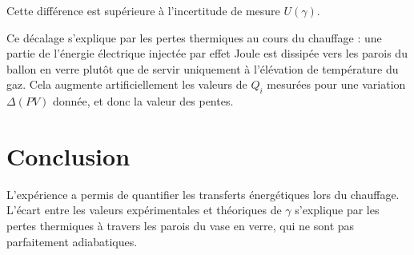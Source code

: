 \documentclass[a4paper,9pt,french]{scrartcl}
\begin{document}
Cette différence est supérieure à l'incertitude de mesure $U(\gamma)$.

Ce décalage s'explique par les pertes thermiques au cours du chauffage : une partie de l'énergie électrique injectée par effet Joule est dissipée vers les parois du ballon en verre plutôt que de servir uniquement à l'élévation de température du gaz. Cela augmente artificiellement les valeurs de $Q_i$ mesurées pour une variation $\Delta(PV)$ donnée, et donc la valeur des pentes.
\section{Conclusion}
L'expérience a permis de quantifier les transferts énergétiques lors du chauffage. L'écart entre les valeurs expérimentales et théoriques de $\gamma$ s'explique par les pertes thermiques à travers les parois du vase en verre, qui ne sont pas parfaitement adiabatiques.
\end{document}
